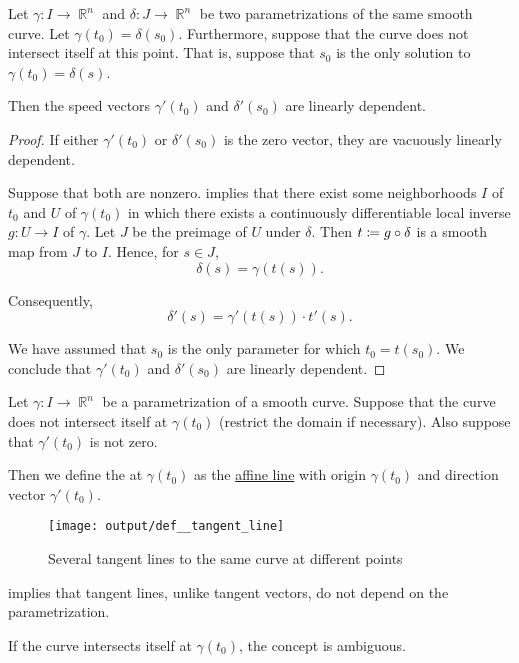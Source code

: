 \begin{proposition}\label{thm:tangent_vector_dependent}
  Let \( \gamma: I \to \BbbR^n \) and \( \delta: J \to \BbbR^n \) be two parametrizations of the same smooth curve. Let \( \gamma(t_0) = \delta(s_0) \). Furthermore, suppose that the curve does not intersect itself at this point. That is, suppose that \( s_0 \) is the only solution to \( \gamma(t_0) = \delta(s) \).

  Then the speed vectors \( \gamma'(t_0) \) and \( \delta'(s_0) \) are linearly dependent.
\end{proposition}
\begin{proof}
  If either \( \gamma'(t_0) \) or \( \delta'(s_0) \) is the zero vector, they are vacuously linearly dependent.

  Suppose that both are nonzero.  implies that there exist some neighborhoods \( I \) of \( t_0 \) and \( U \) of \( \gamma(t_0) \) in which there exists a continuously differentiable local inverse \( g: U \to I \) of \( \gamma \). Let \( J \) be the preimage of \( U \) under \( \delta \). Then \( t \coloneqq g \bincirc \delta \) is a smooth map from \( J \) to \( I \). Hence, for \( s \in J \),
  \begin{equation*}
    \delta(s) = \gamma(t(s)).
  \end{equation*}

  Consequently,
  \begin{equation*}
    \delta'(s) = \gamma'(t(s)) \cdot t'(s).
  \end{equation*}

  We have assumed that \( s_0 \) is the only parameter for which \( t_0 = t(s_0) \). We conclude that \( \gamma'(t_0) \) and \( \delta'(s_0) \) are linearly dependent.
\end{proof}

\begin{definition}\label{def:tangent_line}
  Let \( \gamma: I \to \BbbR^n \) be a parametrization of a smooth curve. Suppose that the curve does not intersect itself at \( \gamma(t_0) \) (restrict the domain if necessary). Also suppose that \( \gamma'(t_0) \) is not zero.

  Then we define the  at \( \gamma(t_0) \) as the \hyperref[def:affine_line]{affine line} with origin \( \gamma(t_0) \) and direction vector \( \gamma'(t_0) \).

  \begin{figure}[!ht]
    \centering
    \texttt{[image: output/def\_\_tangent\_line]}
    \caption{Several tangent lines to the same curve at different points}\label{fig:def:tangent_line}
  \end{figure}

   implies that tangent lines, unlike tangent vectors, do not depend on the parametrization.

  If the curve intersects itself at \( \gamma(t_0) \), the concept is ambiguous.
\end{definition}

